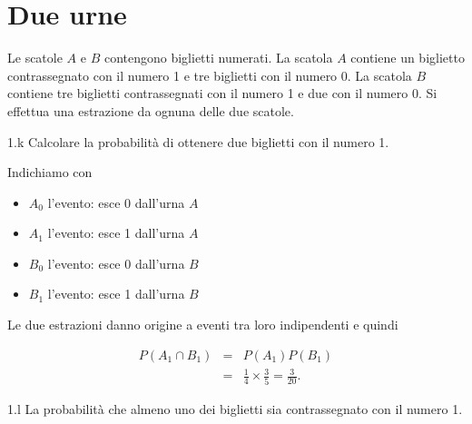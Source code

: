 \documentclass[
  11pt,
]{book}
\providecommand{\tightlist}{%
  \setlength{\itemsep}{0pt}\setlength{\parskip}{0pt}}
\theoremstyle{mytheoremstyle}
\theoremstyle{mydefstyle}
\newenvironment{sol}
  {
  \begin{tcolorbox}[enhanced,breakable,arc=0.1mm,boxrule=1pt,colback=white,colframe=iblue,
  title=\bf \fontfamily{lmss}\selectfont \hspace{.5 cm} Soluzione,drop fuzzy shadow]

}{
\end{tcolorbox}
  }
\begin{document}
\section{Due urne}\label{due-urne}

Le scatole \(A\) e \(B\) contengono biglietti numerati.
La scatola \(A\) contiene un biglietto contrassegnato
con il numero 1 e tre biglietti con il numero 0.
La scatola \(B\) contiene tre biglietti contrassegnati
con il numero 1 e due con il numero 0.
Si effettua una estrazione da ognuna delle due scatole.

1.k Calcolare la probabilità di ottenere due biglietti
con il numero 1.

\begin{sol}
Indichiamo con

\begin{itemize}
\tightlist
\item
  \(A_0\) l'evento: esce 0 dall'urna \(A\)
\item
  \(A_1\) l'evento: esce 1 dall'urna \(A\)
\item
  \(B_0\) l'evento: esce 0 dall'urna \(B\)
\item
  \(B_1\) l'evento: esce 1 dall'urna \(B\)
\end{itemize}

Le due estrazioni danno origine a eventi tra loro
indipendenti e quindi

\begin{eqnarray*}
    P(A_1\cap B_1)
&=& P(A_1) P(B_1) \\
&=& \frac{1}{4} \times \frac{3}{5} = \frac{3}{20}.
\end{eqnarray*}

\end{sol}

1.l La probabilità che almeno uno dei biglietti sia
contrassegnato con il numero 1.
\end{document}
